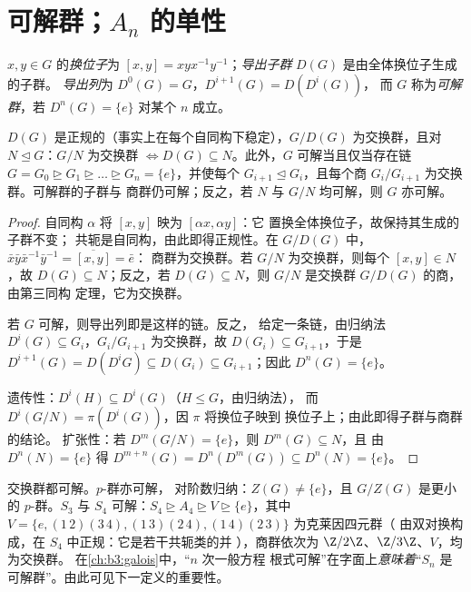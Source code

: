 \section{可解群；\texorpdfstring{$A_n$}{An} 的单性}

\begin{definition}\label{def:b3:groups:derived}
$x, y \in G$ 的\emph{换位子}为 $[x,y]
= xyx^{-1}y^{-1}$；\emph{导出子群}
$D(G)$ 是由全体换位子生成的子群。
\emph{导出列}为 $D^0(G) = G$，$D^{i+1}(G) = D(D^i(G))$，
而 $G$ 称为\emph{可解群}，若 $D^n(G) =
\{e\}$ 对某个 $n$ 成立。
\end{definition}

\begin{proposition}\label{prop:b3:groups:derived}
$D(G)$ 是正规的（事实上在每个自同构下稳定），$G/D(G)$
为交换群，且对 $N \trianglelefteq G$：$G/N$ 为交换群 $\iff
D(G) \subseteq N$。此外，$G$ 可解当且仅当存在链
$G = G_0 \trianglerighteq G_1 \trianglerighteq \dots
\trianglerighteq G_n = \{e\}$，并使每个 $G_{i+1} \trianglelefteq
G_i$，且每个商 $G_i/G_{i+1}$ 为交换群。可解群的子群与
商群仍可解；反之，若 $N$ 与
$G/N$ 均可解，则 $G$ 亦可解。
\end{proposition}

\begin{proof}
自同构 $\alpha$ 将 $[x,y]$ 映为 $[\alpha x, \alpha y]$：它
置换全体换位子，故保持其生成的子群不变；
共轭是自同构，由此即得正规性。在 $G/D(G)$
中，$\bar x\bar y \bar x^{-1}\bar y^{-1} = \overline{[x,y]} = \bar e$：
商群为交换群。若 $G/N$ 为交换群，则每个 $[x,y] \in
N$，故 $D(G) \subseteq N$；反之，若 $D(G) \subseteq N$，则
$G/N$ 是交换群 $G/D(G)$ 的商，由第三同构
定理，它为交换群。

若 $G$ 可解，则导出列即是这样的链。反之，
给定一条链，由归纳法 $D^i(G) \subseteq G_i$，$G_i/G_{i+1}$
为交换群，故 $D(G_i) \subseteq G_{i+1}$，于是 $D^{i+1}(G) = D(D^i G)
\subseteq D(G_i) \subseteq G_{i+1}$；因此 $D^n(G) = \{e\}$。

遗传性：$D^i(H) \subseteq D^i(G)$（$H \leq G$，由归纳法），
而 $D^i(G/N) = \pi(D^i(G))$，因 $\pi$ 将换位子映到
换位子上；由此即得子群与商群的结论。
扩张性：若 $D^m(G/N) = \{e\}$，则 $D^m(G) \subseteq N$，且
由 $D^n(N) = \{e\}$ 得 $D^{m+n}(G) = D^n(D^m(G)) \subseteq D^n(N)
= \{e\}$。
\end{proof}

\begin{example}\label{ex:b3:groups:solvableexamples}
交换群都可解。$p$-群亦可解，
对阶数归纳：$Z(G) \neq \{e\}$，且 $G/Z(G)$ 是更小的
$p$-群。$S_3$ 与 $S_4$ 可解：$S_4 \trianglerighteq A_4
\trianglerighteq V \trianglerighteq \{e\}$，其中 $V = \{e,
(1\,2)(3\,4), (1\,3)(2\,4), (1\,4)(2\,3)\}$ 为克莱因四元群（
由双对换构成，在 $S_4$ 中正规：它是若干共轭类的并
），商群依次为 $\Z/2\Z$、$\Z/3\Z$、$V$，均为交换群。
在\cref{ch:b3:galois}中，“$n$ 次一般方程
根式可解”在字面上\emph{意味着}“$S_n$ 是
可解群”。由此可见下一定义的重要性。
\end{example}

